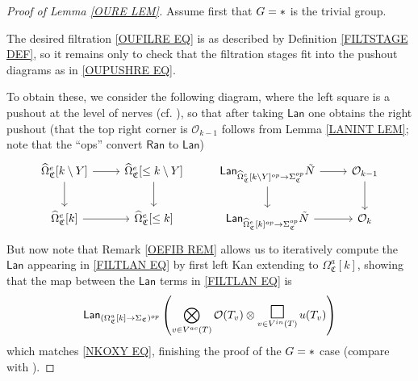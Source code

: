 \documentclass[a4paper,10pt
]{article}%
\numberwithin{equation}{section}
\numberwithin{figure}{section}
\theoremstyle{definition} %
\renewcommand{\O}{\ensuremath{\mathcal O}}
\newcommand{\1}{\ensuremath{\mathbbm 1}}%
\newcommand{\SC}{\Sigma_{\mathfrak C}}
\newcommand{\OC}{\Omega_{\mathfrak C}}
\begin{document}
\begin{proof}[Proof of Lemma \ref{OURE LEM}]
	Assume first that $G = \**$ is the trivial group.
	
	The desired filtration \eqref{OUFILRE EQ} is as described by Definition \ref{FILTSTAGE DEF},
	so it remains only to check that the filtration stages
	fit into the pushout diagrams as in \eqref{OUPUSHRE EQ}.
	
	To obtain these, we consider the following diagram,
	where the left square is a pushout at the level of nerves (cf. \cite[(5.75)]{BP21}),
	so that after taking $\mathsf{Lan}$ 
	one obtains the right pushout
	(that the top right corner is $\O_{k-1}$ follows from Lemma \ref{LANINT LEM}; note that the ``ops''
	convert $\mathsf{Ran}$ to $\mathsf{Lan}$)
	\begin{equation}\label{FILTLAN EQ}
	\begin{tikzcd}
	\widehat\Omega_{\mathfrak C}^e[k \setminus Y] \arrow[r] \arrow[d]
	&
	\widehat\Omega_{\mathfrak C}^e[\leq k \setminus Y] \arrow[d]
	&
	\mathsf{Lan}_{\widehat\Omega_{\mathfrak C}^e[k \setminus Y]^{op} \to \SC^{op}} \tilde N \arrow[r] \arrow[d]
	&
	\O_{k-1} \arrow[d]
	\\
	\widehat\Omega_{\mathfrak C}^e[k] \arrow[r]
	&
	\widehat\Omega_{\mathfrak C}^e[\leq k]
	&
	\mathsf{Lan}_{\widehat \Omega_{\mathfrak C}^e[k]^{op} \to \SC^{op}} \tilde N \arrow[r]
	&
	\O_k
	\end{tikzcd}
	\end{equation}
	But now note that Remark \ref{OEFIB REM}
	allows us to iteratively compute the
	$\mathsf{Lan}$
	appearing in \eqref{FILTLAN EQ}
	by first left Kan extending to 
	$\Omega^a_{\mathfrak{C}}[k]$,
	showing that the map between the $\mathsf{Lan}$ terms 
	in \eqref{FILTLAN EQ} is
	\begin{equation}\label{FILTLANFIN EQ}
	\mathsf{Lan}_{(\OC^a[k] \to \SC)^{op}}\left(
	\bigotimes_{v \in V^{ac}(T)}\O(T_v) \otimes
	\mathop{\mathlarger{\mathlarger{\mathlarger{\square}}}}\limits_{v \in V^{in}(T)} u(T_v)
	\right)
	\end{equation}
	which matches \eqref{NKOXY EQ}, finishing the proof of the 
	$G = \**$ case
	(compare with \cite[Prop. 5.77]{BP21}).
	

\end{proof}
\end{document}
